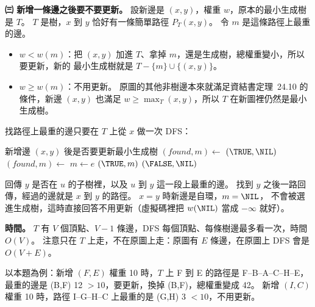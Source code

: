 \begin{pastsoln}
\textbf{㈢ 新增一條邊之後要不要更新。} 設新邊是 $(x, y)$，權重 $w$，原本的最小生成樹是 $T$。
$T$ 是樹，$x$ 到 $y$ 恰好有一條簡單路徑 $P_T(x,y)$。 令 $m$ 是這條路徑上最重的邊。
\begin{itemize}
\item $w < w(m)$：把 $(x,y)$ 加進 $T$、拿掉 $m$，還是生成樹，總權重變小，所以要更新，新的
最小生成樹就是 $T - \{m\} \cup \{(x,y)\}$。
\item $w \ge w(m)$：不用更新。 原圖的其他非樹邊本來就滿足資結書定理~24.10 的條件，新邊
$(x,y)$ 也滿足 $w \ge \max_T(x,y)$，所以 $T$ 在新圖裡仍然是最小生成樹。
\end{itemize}
找路徑上最重的邊只要在 $T$ 上從 $x$ 做一次 DFS：

\begin{pseudo}{新增邊 $(x,y)$ 後是否要更新最小生成樹}
    \State $(\mathit{found}, m) \gets$ 
        \State \Return \TRUE {}
    \EndIf
    \State \Return \FALSE
\EndFunction
\Statex
{} 
        \State \Return $(\TRUE, \NIL)$
    \EndIf
        \State $(\mathit{found}, m) \gets$ 
                \State $m \gets e$
            \EndIf
            \State \Return $(\TRUE, m)$
        \EndIf
    \EndFor
    \State \Return $(\FALSE, \NIL)$
\EndFunction
\end{pseudo}

 回傳 $y$ 是否在 $u$ 的子樹裡，以及 $u$ 到 $y$ 這一段上最重的邊。
找到 $y$ 之後一路回傳，經過的邊就是 $x$ 到 $y$ 的路徑。 $x = y$ 時新邊是自環，$m = \NIL$，
不會被選進生成樹，這時直接回答不用更新（虛擬碼裡把 $w(\NIL)$ 當成 $-\infty$ 就好）。

\textbf{時間。} $T$ 有 $V$ 個頂點、$V-1$ 條邊，DFS 每個頂點、每條樹邊最多看一次，時間 $O(V)$。
注意只在 $T$ 上走，不在原圖上走：原圖有 $E$ 條邊，在原圖上 DFS 會是 $O(V+E)$。

以本題為例：新增 $(F, E)$ 權重 10 時，$T$ 上 F 到 E 的路徑是 F--B--A--C--H--E，最重的邊是
(B,F) 12 $> 10$，要更新，換掉 (B,F)，總權重變成 42。 新增 $(I, C)$ 權重 10 時，路徑 I--G--H--C
上最重的是 (G,H) 3 $< 10$，不用更新。
\end{pastsoln}
